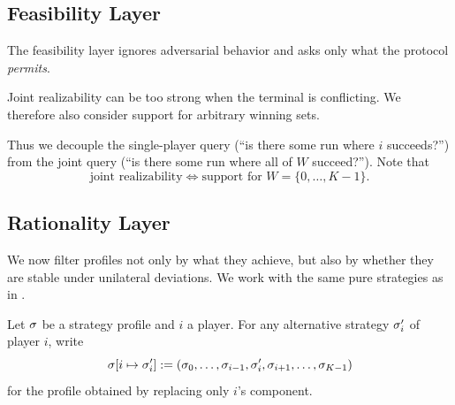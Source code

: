 \subsection{Feasibility Layer}
\label{subsec:feasible}

The feasibility layer ignores adversarial behavior and asks only what the
protocol \emph{permits}.


Joint realizability can be too strong when the terminal is conflicting. We
therefore also consider support for arbitrary winning sets.


Thus we decouple the single-player query (``is there
some run where $i$ succeeds?'') from the joint query (``is there some run where
all of $W$ succeed?''). Note that
\[
  \text{joint realizability} \iff \text{support for } W = \{0,\dots,K-1\}.
\]

\subsection{Rationality Layer}
\label{subsec:rationality}

We now filter profiles not only by what they achieve, but also by whether they
are stable under unilateral deviations. We work with the same pure strategies
as in .

\begin{definition}
Let $\sigma$ be a strategy profile and $i$ a player. For any alternative
strategy $\sigma_i'$ of player $i$, write
\[
  \sigma[i \mapsto \sigma_i'] := (\sigma_0,\dots,\sigma_{i-1},\sigma_i',\sigma_{i+1},\dots,\sigma_{K-1})
\]
for the profile obtained by replacing only $i$’s component.
\end{definition}

